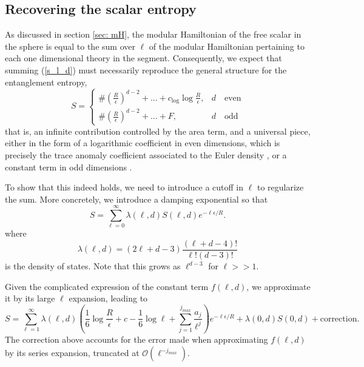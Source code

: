 \documentclass[12pt,a4paper]{article}
\begin{document}
\subsection{Recovering the scalar entropy}
As discussed in section \ref{sec: mH}, the modular Hamiltonian of the free scalar in the sphere is equal to the sum over $\ell$ of the modular Hamiltonian pertaining to each one dimensional theory in the segment. Consequently, we expect that summing (\ref{s_l_d}) must necessarily reproduce the general structure for the entanglement entropy,
\begin{equation}\label{Sgen}
S=\begin{cases}
      \#\left(\frac{R}{\epsilon}\right)^{d-2}+ ... +c_{\text{log}} \log{\frac{R}{\epsilon}}, & d \quad\text{even} \\
       \#\left(\frac{R}{\epsilon}\right)^{d-2}+ ... + F, & d \quad \text{odd}
    \end{cases}
\end{equation}
that is, an infinite contribution controlled by the area term, and a universal piece, either in the form of a logarithmic coefficient in even dimensions, which is precisely the trace anomaly coefficient associated to the Euler density \cite{Cappelli:2000fe,Casini:2010kt,Casini:2011kv}, or a constant term in odd dimensions \cite{Klebanov:2011gs, Liu:2013una, Casini:2015woa}.

To show that this indeed holds, we need to introduce a cutoff in $\ell$ to regularize the sum. More concretely, we introduce a damping exponential so that
\begin{equation}
S=\sum_{\ell=0}^{\infty} \lambda(\ell, d) S(\ell, d) e^{-\ell \epsilon/R}.
\end{equation}
where
\begin{equation}
\lambda(\ell, d)=(2 \ell + d -3) \frac{(\ell + d -4)!}{\ell! (d-3)!}
\end{equation}
is the density of states. Note that this grows as $\ell^{d-3}$ for $\ell>>1$.

Given the complicated expression of the constant term $f(\ell,d)$, we approximate it by its large $\ell$ expansion, leading to
\begin{equation}\label{Ssum}
S= \sum_{\ell=1}^{\infty} \lambda(\ell, d) \left( \frac{1}{6}\log{\frac{R}{\epsilon}}+ c -\frac{1}{6}\log{\ell} +\sum_{j=1}^{j_{max}}\frac{a_j}{\ell^j}\right)e^{-\ell \epsilon/R} + \lambda(0, d) S(0, d) +\text{correction}.
\end{equation}
The correction above accounts for the error made when approximating $f(\ell,d)$ by its series expansion, truncated at $\mathcal{O}({\ell^{-j_{max}}})$.
\end{document}

